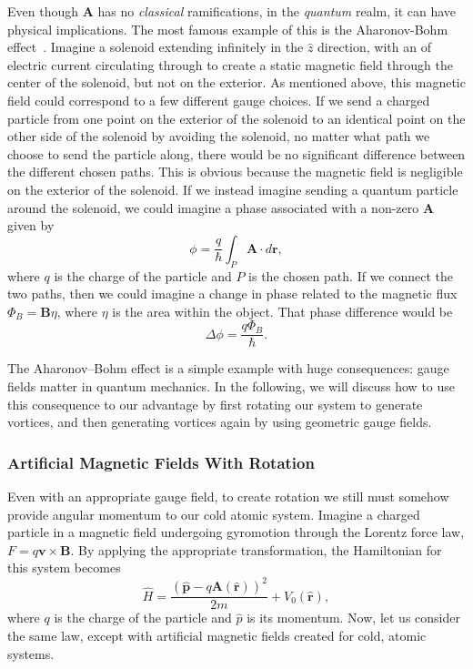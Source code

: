 Even though $\mathbf{A}$ has no \textit{classical} ramifications, in the \textit{quantum} realm, it can have physical implications.
The most famous example of this is the Aharonov-Bohm effect~\cite{Aharonov1959}. 
Imagine a solenoid extending infinitely in the $\hat z$ direction, with an of electric current circulating through to create a static magnetic field through the center of the solenoid, but not on the exterior. 
As mentioned above, this magnetic field could correspond to a few different gauge choices.
If we send a charged particle from one point on the exterior of the solenoid to an identical point on the other side of the solenoid by avoiding the solenoid, no matter what path we choose to send the particle along, there would be no significant difference between the different chosen paths.
This is obvious because the magnetic field is negligible on the exterior of the solenoid.
If we instead imagine sending a quantum particle around the solenoid, we could imagine a phase associated with a non-zero $\mathbf{A}$ given by
\begin{equation}
\phi = \frac{q}{\hbar}\int_P \mathbf{A} \cdot d\mathbf{r},
\end{equation}
where $q$ is the charge of the particle and $P$ is the chosen path.
If we connect the two paths, then we could imagine a change in phase related to the magnetic flux $\Phi_B = \mathbf{B}\eta$, where $\eta$ is the area within the object. 
That phase difference would be
\begin{equation}
\Delta\phi = \frac{q\Phi_B}{\hbar}.
\end{equation}

The Aharonov--Bohm effect is a simple example with huge consequences: gauge fields matter in quantum mechanics. 
In the following, we will discuss how to use this consequence to our advantage by first rotating our system to generate vortices, and then generating vortices again by using geometric gauge fields.

\subsubsection{Artificial Magnetic Fields With Rotation}
\label{sec:rot}

Even with an appropriate gauge field, to create rotation we still must somehow provide angular momentum to our cold atomic system.
Imagine a charged particle in a magnetic field undergoing gyromotion through the Lorentz force law, $F=q\mathbf{v} \times \mathbf{B}$.
By applying the appropriate transformation, the Hamiltonian for this system becomes
\begin{equation}
\hat H = \frac{(\hat{\mathbf{p}} - q \mathbf{A}(\hat{\mathbf{r}}))^2}{2m} + V_0(\hat{\mathbf{r}}),
\label{eqn:lorentz}
\end{equation}
where $q$ is the charge of the particle and $\hat p$ is its momentum.
Now, let us consider the same law, except with artificial magnetic fields created for cold, atomic systems.

